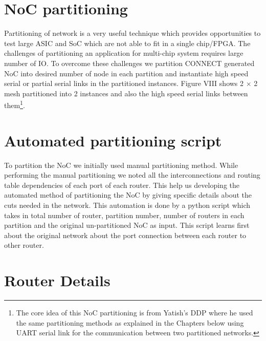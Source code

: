 \section {NoC partitioning}

Partitioning of network is a very useful technique which provides opportunities to test large ASIC and SoC which are not able to fit in a single chip/FPGA. The challenges of partitioning an application for multi-chip system requires large number of IO. To overcome these challenges we partition CONNECT generated NoC into desired number of node in each partition and instantiate high speed serial or partial serial links in the partitioned instances. Figure VIII shows 2 $\times$ 2 mesh partitioned into 2 instances and also the high speed serial links between them\footnote{The core idea of this NoC partitioning is from Yatish's DDP where he used the same partitioning methods as explained in the Chapters below using UART serial link for the communication between two partitioned networks.}.\\
\section {Automated partitioning script}

To partition the NoC we initially used manual partitioning method. While performing the manual partitioning we noted all the interconnections and routing table dependencies of each port of each router. This help us developing the automated method of partitioning the NoC by giving specific details about the cuts needed in the network. This automation is done by a python script \cite{yatish_ddp} which takes in total number of router, partition number, number of routers in each partition and the original un-partitioned NoC as input. This script learns first about the original network about the port connection between each router to other router. \\

\section {Router Details}

